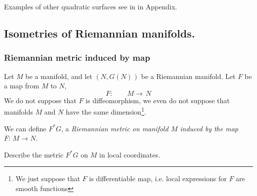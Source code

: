 \documentclass[12pt]{article}
\theoremstyle{theorem}
\numberwithin{equation}{section}
\begin{document}





  Examples of other quadratic 
surfaces see in in Appendix.



\subsection {Isometries of Riemannian manifolds.}

\subsubsection {Riemannian metric induced by map}

Let $M$ be a manifold, and let $(N,G(N)^{})$ 
be a Riemannian manifold.
Let $F$ be a map from $M$ to $N$,
         $$
F\colon \qquad  M\longrightarrow\, N
         $$
We do not suppose that $F$ is diffeomorphism, we 
even do not suppose that manifolds $M$ and $N$
have the same dimension\footnote{We just suppose that
$F$ is differentiable map, i.e. local expressions
for $F$ are smooth functions}.

  We can define $F^*G$,  a {\it Riemannian metric on
manifold $M$ induced by the map $F\colon\, M\to N$}.

 Describe the metric $F^*G$ on $M$ in local coordinates.
  
\end{document}
